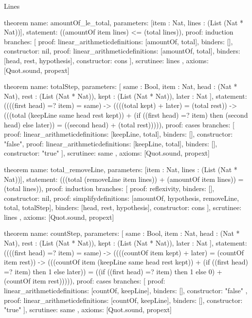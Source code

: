 \begin{lexlean}{Lines}
\begin{semanticmodule}
theorem{
  name: amountOf_le_total,
  parameters: [item : Nat, lines : (List (Nat * Nat))],
  statement: ((amountOf item lines) <= (total lines)),
  proof: induction{
    branches: [
      {proof: linear_arithmetic{definitions: [amountOf, total]}, binders: [], constructor: nil},
      {
        proof: linear_arithmetic{definitions: [amountOf, total]},
        binders: [head, rest, hypothesis],
        constructor: cons
      }
    ],
    scrutinee: lines
  },
  axioms: [Quot.sound, propext]
}

theorem{
  name: totalStep,
  parameters: [
    same : Bool,
    item : Nat,
    head : (Nat * Nat),
    rest : (List (Nat * Nat)),
    kept : (List (Nat * Nat)),
    later : Nat
  ],
  statement: ((((first head) =? item) = same) -> ((((total kept) + later) = (total rest)) -> (((total (keepLine same head rest kept)) + (if ((first head) =? item) then (second head) else later)) = ((second head) + (total rest))))),
  proof: cases{
    branches: [
      {proof: linear_arithmetic{definitions: [keepLine, total]}, binders: [], constructor: "false"},
      {proof: linear_arithmetic{definitions: [keepLine, total]}, binders: [], constructor: "true"}
    ],
    scrutinee: same
  },
  axioms: [Quot.sound, propext]
}

theorem{
  name: total_removeLine,
  parameters: [item : Nat, lines : (List (Nat * Nat))],
  statement: (((total (removeLine item lines)) + (amountOf item lines)) = (total lines)),
  proof: induction{
    branches: [
      {proof: reflexivity{}, binders: [], constructor: nil},
      {
        proof: simplify{definitions: [amountOf, hypothesis, removeLine, total, totalStep]},
        binders: [head, rest, hypothesis],
        constructor: cons
      }
    ],
    scrutinee: lines
  },
  axioms: [Quot.sound, propext]
}

theorem{
  name: countStep,
  parameters: [
    same : Bool,
    item : Nat,
    head : (Nat * Nat),
    rest : (List (Nat * Nat)),
    kept : (List (Nat * Nat)),
    later : Nat
  ],
  statement: ((((first head) =? item) = same) -> ((((countOf item kept) + later) = (countOf item rest)) -> (((countOf item (keepLine same head rest kept)) + (if ((first head) =? item) then 1 else later)) = ((if ((first head) =? item) then 1 else 0) + (countOf item rest))))),
  proof: cases{
    branches: [
      {
        proof: linear_arithmetic{definitions: [countOf, keepLine]},
        binders: [],
        constructor: "false"
      },
      {proof: linear_arithmetic{definitions: [countOf, keepLine]}, binders: [], constructor: "true"}
    ],
    scrutinee: same
  },
  axioms: [Quot.sound, propext]
}


\end{semanticmodule}
\end{lexlean}
